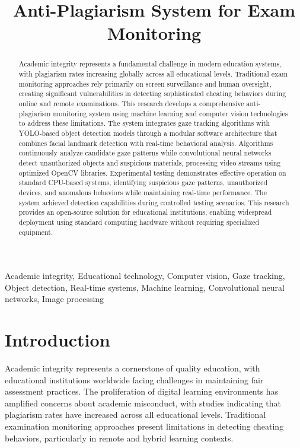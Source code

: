 \documentclass[conference]{IEEEtran}
\title{Anti-Plagiarism System for Exam Monitoring}
\author{
    \IEEEauthorblockN{Valentin Pletea-Marinescu}
    \IEEEauthorblockA{
        \textit{National University of Science and Technology POLITEHNICA Bucharest}\\
        Email: \texttt{pletea.valentin2003@gmail.com}
    }
}
\begin{document}
\maketitle

\begin{abstract}
Academic integrity represents a fundamental challenge in modern education systems, 
with plagiarism rates increasing globally across all educational levels. Traditional 
exam monitoring approaches rely primarily on screen surveillance and human oversight, 
creating significant vulnerabilities in detecting sophisticated cheating behaviors 
during online and remote examinations.
This research develops a comprehensive anti-plagiarism monitoring system using 
machine learning and computer vision technologies to address these limitations. 
The system integrates gaze tracking algorithms with YOLO-based object detection 
models through a modular software architecture that combines facial landmark 
detection with real-time behavioral analysis. Algorithms continuously analyze 
candidate gaze patterns while convolutional neural networks detect unauthorized objects 
and suspicious materials, processing video streams using optimized OpenCV libraries.
Experimental testing demonstrates effective operation on standard CPU-based 
systems, identifying suspicious gaze patterns, unauthorized devices, 
and anomalous behaviors while maintaining real-time performance. The system 
achieved detection capabilities during controlled testing scenarios. This research 
provides an open-source solution for educational institutions, enabling 
widespread deployment using standard computing hardware without requiring specialized equipment.
\end{abstract}

\begin{IEEEkeywords}
Academic integrity, Educational technology, Computer vision, Gaze tracking, Object detection, Real-time systems, Machine learning, Convolutional neural networks, Image processing
\end{IEEEkeywords}

\section{Introduction}

Academic integrity represents a cornerstone of quality education, with educational 
institutions worldwide facing challenges in maintaining fair assessment 
practices. The proliferation of digital learning environments has amplified concerns 
about academic misconduct, with studies indicating that plagiarism rates have increased 
across all educational levels\cite{zimba2021plagiarism}. Traditional 
examination monitoring approaches present limitations 
in detecting cheating behaviors, particularly in remote and hybrid 
learning contexts\cite{nazari2019detection}.
\end{document}

